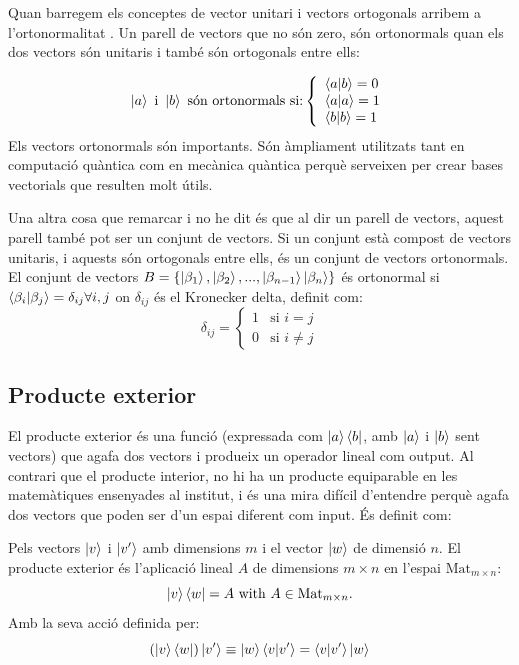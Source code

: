 Quan barregem els conceptes de vector unitari i vectors ortogonals arribem a l'ortonormalitat \cite{QCandQI:GramSchmidt}. Un parell de vectors que no són zero, són ortonormals quan els dos vectors són unitaris i també són ortogonals entre ells:

$$
\ket{a} \text{ i } \ket{b} \text{ són ortonormals si:} \left\{
	\begin{array}{ll}
		\bra{a}\ket{b} = 0 \\
		\bra{a}\ket{a} = 1 \\
		\bra{b}\ket{b} = 1 \\
	\end{array}
\right.
$$
Els vectors ortonormals són importants. Són àmpliament utilitzats tant en computació quàntica com en mecànica quàntica perquè serveixen per crear bases vectorials que resulten molt útils.

Una altra cosa que remarcar i no he dit és que al dir un parell de vectors, aquest parell també pot ser un conjunt de vectors. Si un conjunt està compost de vectors unitaris, i aquests són ortogonals entre ells, és un conjunt de vectors ortonormals.
El conjunt de vectors $ B = \{\ket{\beta_1}, \ket{\beta_2}, ..., \ket{\beta_{n-1}} \ket{\beta_n}\} $ és ortonormal si $\bra{\beta_i}\ket{\beta_j} = \delta_{ij}  \forall i, j$ \cite{QCandQI:GramSchmidt} on $\delta_{ij}$ és el Kronecker delta, definit com:
$$
\delta_{ij} =
\begin{cases}
	1 &\text{si } i=j\\
	0 &\text{si } i\neq j
\end{cases}
$$

\subsection{Producte exterior}
El producte exterior és una funció (expressada com $\ket{a}\bra{b}$, amb $\ket{a}$ i $\ket{b}$ sent vectors) que agafa dos vectors i produeix un operador lineal com output. Al contrari que el producte interior, no hi ha un producte equiparable en les matemàtiques ensenyades al institut, i és una mira difícil d'entendre perquè agafa dos vectors que poden ser d'un espai diferent com input. És definit com:

Pels vectors $\ket{v}$ i $\ket{v'}$ amb dimensions $m$ i el vector $\ket{w}$ de dimensió $n$. El producte exterior és l'aplicació lineal $A$ de dimensions $m \times n$ en l'espai $\mathrm{Mat}_{m\times n}$:
$$
\ket{v}\bra{w} = A \text{ with } A\in \mathrm{Mat}_{m\times n} .
$$ 
Amb la seva acció definida per: 
\begin{equation}
	(\ket{v}\bra{w})\ket{v'} \equiv \ket{w}\bra{v}\ket{v'} = \bra{v}\ket{v'}\ket{w}
	\label{eq:outer_def}
\end{equation}

